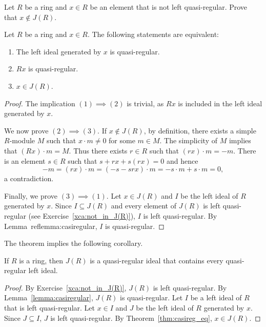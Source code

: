 \begin{exercise}
\label{xca:not_in_J(R)}
Let $R$ be a ring and 
$x\in R$ be an element that is not left quasi-regular. Prove that $x\not\in J(R)$. 
\end{exercise}

\begin{theorem}
	\label{thm:casireg_eq}
	Let $R$ be a ring and $x\in R$. The following statements are equivalent: 
	\begin{enumerate}
		\item The left ideal generated by $x$ is quasi-regular.
		\item $Rx$ is quasi-regular.
		\item $x\in J(R)$.
	\end{enumerate}
\end{theorem}

\begin{proof}
	The implication $(1)\implies(2)$ is trivial, as $Rx$ is included in the left ideal 
	generated by $x$.  
	
	We now prove $(2)\implies(3)$. If
	$x\not\in J(R)$, by definition, there exists a simple 
	$R$-module $M$ such that $x\cdot m\ne 0$ for some $m\in M$. The simplicity of $M$ implies
	that $(Rx)\cdot m=M$. Thus there exists $r\in R$ such that $(rx)\cdot m=-m$. There is an element 
	$s\in R$ such that $s+rx+s(rx)=0$ and hence 
	\[
	-m=(rx)\cdot m=(-s-srx)\cdot m=-s\cdot m+s\cdot m=0,
	\]
	a contradiction. 
	
	Finally, we prove $(3)\implies(1)$. Let $x\in J(R)$ and $I$ be the left ideal of $R$ 
 generated by $x$. Since $I\subseteq J(R)$ and every element of $J(R)$ is left quasi-regular (see Exercise~\ref{xca:not_in_J(R)}), 
 $I$ is left quasi-regular. By Lemma~ref{lemma:casiregular}, $I$ is quasi-regular. 
\end{proof}

The theorem implies the following corollary. 

\begin{corollary}
	If $R$ is a ring, then $J(R)$ is a quasi-regular ideal that contains every 
	quasi-regular left ideal. 
\end{corollary}

\begin{proof}
    By Exercise~\ref{xca:not_in_J(R)}, $J(R)$ is left quasi-regular. By Lemma~\ref{lemma:casiregular}, $J(R)$ is quasi-regular. 
    Let $I$ be a left ideal of $R$ that is left quasi-regular. Let $x\in I$ and $J$ be the left
    ideal of $R$ generated by $x$. Since $J\subseteq I$, $J$ is left quasi-regular. By Theorem~\ref{thm:casireg_eq}, $x\in J(R)$. 
\end{proof}

